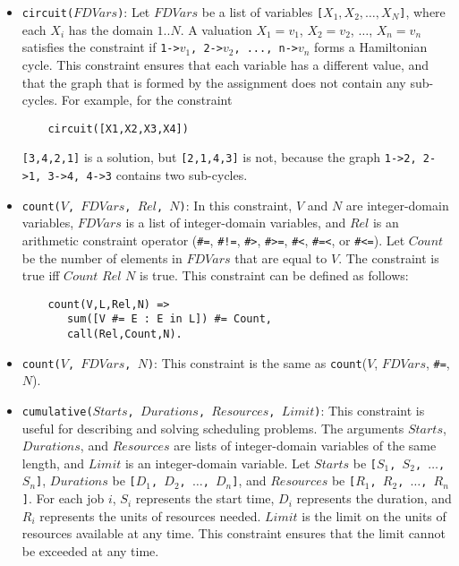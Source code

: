\begin{itemize}
\item \texttt{circuit($FDVars$)}: Let $FDVars$ be a list of variables \texttt{[$X_1,X_2,\ldots,X_N$]}, where each \texttt{$X_i$} has the domain $1..N$. A valuation $X_1=v_1$, $X_2=v_2$, $\ldots$, $X_n=v_n$ satisfies the constraint if \texttt{1->$v_1$, 2->$v_2$, ..., n->$v_n$} forms a Hamiltonian cycle. This constraint ensures that each variable has a different value, and that the graph that is formed by the assignment does not contain any sub-cycles. For example, for the constraint 
\begin{verbatim}
    circuit([X1,X2,X3,X4])
\end{verbatim}
\texttt{[3,4,2,1]} is a solution, but \texttt{[2,1,4,3]} is not, because the graph \texttt{1->2, 2->1, 3->4, 4->3} contains two sub-cycles.
\item \texttt{count($V$, $FDVars$, $Rel$, $N$)}:  In this constraint, $V$ and $N$ are integer-domain variables, $FDVars$ is a list of integer-domain variables, and $Rel$ is an arithmetic constraint operator (\verb+#=+,  \verb+#!=+,  \verb+#>+,  \verb+#>=+,  \verb+#<+,  \verb+#=<+, or \verb+#<=+). Let $Count$ be the number of elements in $FDVars$ that are equal to $V$. The constraint is true iff $Count$ $Rel$ $N$ is true. This constraint can be defined as follows:
\begin{verbatim}
    count(V,L,Rel,N) =>
       sum([V #= E : E in L]) #= Count,
       call(Rel,Count,N).
\end{verbatim}
\item \texttt{count($V$, $FDVars$, $N$)}: This constraint is the same as \texttt{count}($V$, $FDVars$, \verb+#=+, $N$).

\item \texttt{cumulative($Starts$, $Durations$, $Resources$, $Limit$)}: This constraint is useful for describing and solving scheduling problems. The arguments $Starts$, $Durations$, and $Resources$ are lists of integer-domain variables of the same length, and $Limit$ is an integer-domain variable. Let $Starts$ be \texttt{[$S_1$, $S_2$, $\ldots$, $S_n$]}, $Durations$ be \texttt{[$D_1$, $D_2$, $\ldots$, $D_n$]}, and $Resources$ be \texttt{[$R_1$, $R_2$, $\ldots$, $R_n$]}. For each job \texttt{$i$}, \texttt{$S_i$} represents the start time, \texttt{$D_i$} represents the duration, and \texttt{$R_i$} represents the units of resources needed. $Limit$ is the limit on the units of resources available at any time. This constraint ensures that the limit cannot be exceeded at any time.


\end{itemize}
